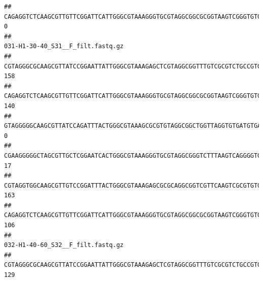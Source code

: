\documentclass[]{article}
\begin{document}
\begin{verbatim}
## CAGAGGTCTCAAGCGTTGTTCGGATTCATTGGGCGTAAAGGGTGCGTAGGCGGCGCGGTAAGTCGGGTGTGAAATCTCGGGGCTTAACTCCGAAACTGCATTCGATACTGCCGTGCTTGAGGACTGGAGAGGAGACTGGAATTTACGGTGTAGCGGTGAAATGCGTAGATATCGTAAGGAAGACCAGTGGCGAAGGCGGGTCTCTGGACAGTTCCTGACGCTGAGGCACGAAGGCCAGGGGAGCAAACG                                0
##                                                                                                                                                                                                                                                           031-H1-30-40_S31__F_filt.fastq.gz
## CGTAGGGCGCAAGCGTTATCCGGAATTATTGGGCGTAAAGAGCTCGTAGGCGGTTTGTCGCGTCTGCCGTGAAAGTCCGGGGCTCAACTCCGGATCTGCGGTGGGTACGGGCAGACTAGAGTGATGTAGGGGAGACTGGAATTCCTGGTGTAGCGGTGAAATGCGCAGATATCAGGAGGAACACCGATGGCGAAGGCAGGTCTCTGGGCATTAACTGACGCTGAGGAGCGAAAGCATGGGGAGCGAACA                               158
## CAGAGGTCTCAAGCGTTGTTCGGATTCATTGGGCGTAAAGGGTGCGTAGGCGGCGCGGTAAGTCGGGTGTGAAATCTCGGAGCTTAACTCCGAAACTGCATTCGATACTGCCGTGCTTGAGGACTGGAGAGGAGACTGGAATTTACGGTGTAGCGGTGAAATGCGTAGATATCGTAAGGAAGACCAGTGGCGAAGGCGGGTCTCTGGACAGTTCCTGACGCTGAGGCACGAAGGCCAGGGGAGCAAACG                               140
## GTAGGGGGCAAGCGTTATCCAGATTTACTGGGCGTAAAGCGCGTGTAGGCGGCTGGTTAGGTGTGATGTGAAATCTTCCGGCTCAACCGGAAAACTGCATTGCAAACCGGCCTGGCTAGAGTGCAGGAGAGGGAAGCGGAATTCCAGGTGTAGCGGTGAAATGCGTAGATATCTGGAGGAACACCAGTGGCGAAGGCGGCTTCCTGGCCTGCAACTGACGCTGAGACGCGAAAGCGTGGGGAGCGAAC                                  0
## CGAAGGGGGCTAGCGTTGCTCGGAATCACTGGGCGTAAAGGGTGCGTAGGCGGGTCTTTAAGTCAGGGGTGAAATCCTGGAGCTCAACTCCAGAACTGCCTTTGATACTGAAGATCTTGAGTTCGGGAGAGGTGAGTGGAACTGCGAGTGTAGAGGTGAAATTCGTAGATATTCGCAAGAACACCAGTGGCGAAGGCGGCTCACTGGCCCGATACTGACGCTGAGGCACGAAAGCGTGGGGAGCAAACA                                17
## CGTAGGTGGCAAGCGTTGTCCGGATTTACTGGGCGTAAAGAGCGCGCAGGCGGTCGTTCAAGTCGCGTGTGAAAGCCCCCGGCTCAACTGGGGAGGGTCACGCGATACTGATCGACTCGAAGGCAGGAGAGGGTAGTGGAATTCCCGGTGTAGTGGTGAAATGCGTAGATATCGGGAGGAACACCAGTGGCGAAGGCGACTACCTGGCCTGTTCTTGACGCTGAGGCGCGAAAGCTAGGGGAGCAAACG                               163
## CAGAGGTCTCAAGCGTTGTTCGGATTCATTGGGCGTAAAGGGTGCGTAGGCGGCGCGGTAAGTCGGGTGTGAAATCTCGGGGCTTAACTCCGAAACTGCATTCGATACTGCCGTGCTTGAGGACTGGAGAGGAGACTGGAATTTACGGTGTAGCGGTGAAATGCGTAGATATCGTAAGGAAGACCAGTGGCGAAGGCGGGTCTCTGGACAGTTCCTGACGCTGAGGCACGAAGGCCAGGGGAGCAAACG                               106
##                                                                                                                                                                                                                                                           032-H1-40-60_S32__F_filt.fastq.gz
## CGTAGGGCGCAAGCGTTATCCGGAATTATTGGGCGTAAAGAGCTCGTAGGCGGTTTGTCGCGTCTGCCGTGAAAGTCCGGGGCTCAACTCCGGATCTGCGGTGGGTACGGGCAGACTAGAGTGATGTAGGGGAGACTGGAATTCCTGGTGTAGCGGTGAAATGCGCAGATATCAGGAGGAACACCGATGGCGAAGGCAGGTCTCTGGGCATTAACTGACGCTGAGGAGCGAAAGCATGGGGAGCGAACA                               129

\end{verbatim}
\end{document}
